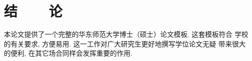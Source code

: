 

\chapter*{结~~~~论}

本论文提供了一个完整的华东师范大学博士（硕士）论文模板. 这套模板符合
学校的有关要求, 方便易用. 这一工作对广大研究生更好地撰写学位论文无疑
带来很大的便利, 在其它场合同样会发挥重要的作用. 
